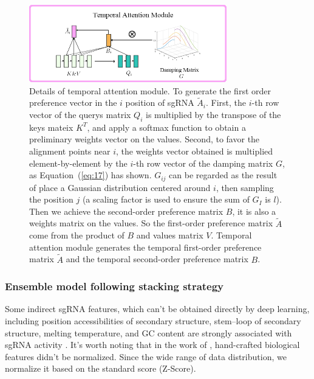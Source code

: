\documentclass{bioinfo}
\begin{document}
\begin{figure}[!tpb]
\centerline{\includegraphics[width=86mm]{temporalattentionmodule.png}}
\caption{        
    Details of temporal attention module. 
    To generate the first order preference vector in the $i$ position of sgRNA $\tilde{A}_i$. 
    First, the $i$-th row vector of the querys matrix $Q_i$ is multiplied by the transpose of the keys mateix $K^T$, and apply a softmax function to obtain a preliminary weights vector on the values. 
    Second, to favor the alignment points near $i$, the weights vector obtained is multiplied element-by-element by the $i$-th row vector of the damping matrix $G$, as Equation~(\ref{eq:17}) has shown. 
    $G_{ij}$ can be regarded as the result of place a Gaussian distribution centered around $i$, then sampling the position $j$ (a scaling factor is used to ensure the sum of $G_I$ is $l$). 
    Then we achieve the second-order preference matrix $B$, it is also a weights matrix on the values. So the first-order preference matrix $\tilde{A}$ come from the product of $B$ and values matrix $V$.
    Temporal attention module generates the temporal first-order preference matrix $\tilde{A}$ and the temporal second-order preference matrix $B$.
    }\label{fig:05}
\end{figure}

\subsubsection{Ensemble model following stacking strategy}

Some indirect sgRNA features, which can't be obtained directly by deep learning, 
including position accessibilities of secondary structure, stem–loop of secondary structure, melting temperature, 
and GC content are strongly associated with sgRNA activity \citep{Wang2016ProteinSS,wang2019optimized}. 
It's worth noting that in the work of \citeauthor{wang2019optimized}, hand-crafted biological features didn't be normalized. 
Since the wide range of data distribution, we normalize it based on the standard score (Z-Score).
\end{document}
